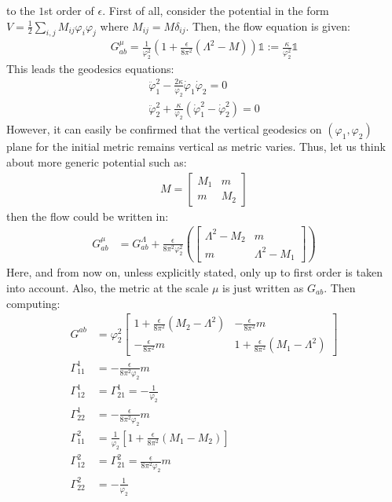 \documentclass[fleqn]{article}
\begin{document}
to the $1$st order of $\epsilon$. First of all, consider the potential in the form $V = \frac{1}{2}\sum _{i,j} M_{ij} \varphi _{i} \varphi _{j} $ where $M_{ij} = M \delta _{ij}$. Then, the flow equation is given:
\begin{align}
G_{ab} ^{\mu} = \frac{1}{\varphi_{2} ^{2}} (1+ \frac{\epsilon} {8\pi ^{2}} (\Lambda^{2} - M))\mathbb{1} := \frac{\kappa}{\varphi _{2} ^{2}} \mathbb{1}
\end{align}
This leads the geodesics equations:
\begin{align}
\ddot \varphi _{1} ^{2} -\frac{2\kappa}{\varphi _{2}} \dot \varphi_{1} \dot \varphi _{2} = 0 \\
\ddot \varphi_{2} ^{2} +\frac{\kappa}{\varphi _{2}} (\dot \varphi _{1} ^{2} - \dot \varphi _{2} ^{2}) = 0
\end{align}
However, it can easily be confirmed that the vertical geodesics on $(\varphi _{1} , \varphi _{2})$ plane for the initial metric remains vertical as metric varies. Thus, let us think about more generic potential such as:
\begin{align}
M = 
\begin{bmatrix}
M_{1} & m \\
m & M_{2}
\end{bmatrix}
\end{align}
then the flow could be written in:
\begin{align}
G_{ab} ^{\mu} &= G_{ab} ^{\Lambda} + \frac{\epsilon} {8\pi ^{2} \varphi _{2} ^{2}}(
\begin{bmatrix}
\Lambda ^{2} - M_{2} & m \\
m & \Lambda ^{2} -M_{1}
\end{bmatrix}
)
\end{align}
Here, and from now on, unless explicitly stated, only up to first order is taken into account. Also, the metric at the scale $\mu$ is just written as $G_{ab}$. Then computing:
\begin{align}
G^{ab} &= \varphi _{2} ^{2} 
\begin{bmatrix}
1 + \frac{\epsilon}{8\pi ^{2}} (M_{2} - \Lambda ^{2} ) & -\frac{\epsilon} {8\pi ^{2}}m \\
- \frac{\epsilon}{8\pi ^{2} }m & 1 + \frac{\epsilon}{8\pi ^{2}}(M_{1} - \Lambda ^{2} )
\end{bmatrix}  \\
\Gamma _{11} ^{1} &= -\frac{\epsilon}{8\pi ^{2} \varphi _{2}} m \\
\Gamma _{12} ^{1} &= \Gamma _{21} ^{1} = -\frac{1}{\varphi _{2}} \\
\Gamma _{22}^{1} &= -\frac{\epsilon} {8\pi ^{2} \varphi _{2}} m \\
\Gamma _{11} ^{2} &= \frac{1} {\varphi _{2}} [1 + \frac{\epsilon} {8\pi ^{2} } (M_1 - M_2)] \\
\Gamma _{12} ^{2} &= \Gamma _{21} ^{2} = \frac{\epsilon}{8\pi ^{2} \varphi _{2}}m \\
\Gamma _{22} ^{2} &= -\frac{1} {\varphi _{2}}
\end{align}
\end{document}
